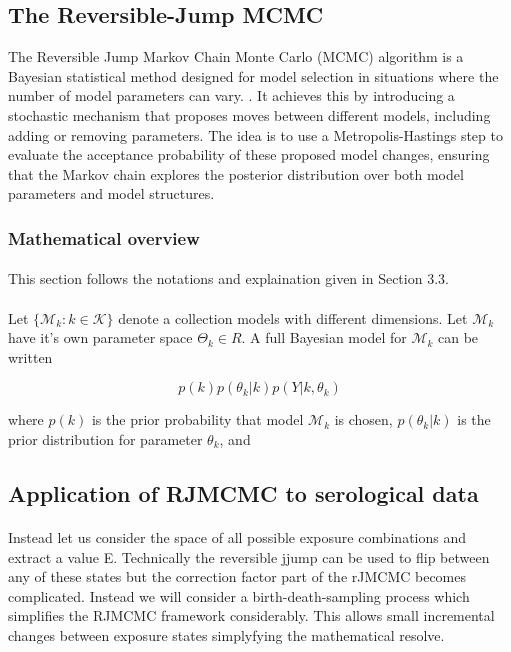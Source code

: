 \documentclass{article}
\begin{document}
\subsection{The Reversible-Jump MCMC}
The Reversible Jump Markov Chain Monte Carlo (MCMC) algorithm is a Bayesian statistical method designed for model selection in situations where the number of model parameters can vary. . It achieves this by introducing a stochastic mechanism that proposes moves between different models, including adding or removing parameters. The idea is to use a Metropolis-Hastings step to evaluate the acceptance probability of these proposed model changes, ensuring that the Markov chain explores the posterior distribution over both model parameters and model structures.  

\subsubsection{Mathematical overview}
\paragraph{}This section follows the notations and explaination given in Section 3.3. 
\paragraph{}Let $\{\mathcal{M}_k: k \in \mathcal{K}\}$ denote a collection models with different dimensions. Let $\mathcal{M}_k$ have it's own parameter space $\Theta_k \in R$. A full Bayesian model for $\mathcal{M}_k$ can be written 

$$p(k)p(\theta_k|k)p(Y| k, \theta_k) $$

where $p(k)$ is the prior probability that model $\mathcal{M}_k$ is chosen, $p(\theta_k|k)$ is the prior distribution for parameter $\theta_k$, and 

\subsection{Application of RJMCMC to serological data}
\paragraph{}Instead let us consider the space of all possible exposure combinations and extract a value E. Technically the reversible jjump can be used to flip between any of these states but the correction factor part of the rJMCMC becomes complicated. Instead we will consider a birth-death-sampling process which simplifies the RJMCMC framework considerably. This allows small incremental changes between exposure states simplyfying the mathematical resolve. 
\end{document}
